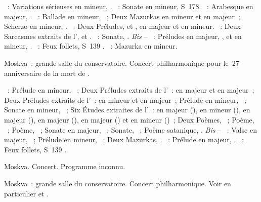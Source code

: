 \begin{description}
 \textsc{\Mendelssohn{}}~: Variations sérieuses en \kD mineur, .
 \textsc{\Liszt{}}~: Sonate en \kB mineur, S~178.
 \textsc{\Schumann{}}~: Arabesque en \kC majeur, .
 \textsc{\Chopin{}}~: Ballade en \kF mineur, ~; Deux Mazurkas en
 \kB mineur et en \kC majeur~; Scherzo en \kB mineur, .
 \textsc{\Chostakovitch{}}~: Deux Préludes,   et
 , en \kF \Sharp majeur et en \kC \Sharp mineur.
 \textsc{\Prokofiev{}}~: Deux Sarcasmes extraits de l', 
 et .
 \textsc{\Scriabine{}}~: Sonate, .
 \emph{Bis} -- \textsc{\Rachmaninov{}}~: Préludes en \kG majeur, 
 , et en \kG \Sharp mineur,  .
 \textsc{\Liszt{}}~: Feux follets, S~139 .
 \textsc{\Chopin{}}~: Mazurka en \kF mineur.
 \item[\DateWithWeekDay{1942-05-31}]
 Moskva~: grande salle du conservatoire.
 Concert philharmonique pour le~27\ieme{} anniversaire de la mort de
 \Scriabine{}.

 \textsc{\Scriabine{}}~: Prélude en \kG \Sharp mineur, 
 ~; Deux Préludes extraits de l'~:  en \kB
 \Flat majeur et  en \kD \Flat majeur~; Deux Préludes extraits de
 l'~:  en \kB \Flat mineur et  en \kF \Sharp
 majeur~; Prélude en \kB mineur,  ~; Sonate en \kF \Sharp
 mineur, ~; Six Études extraites de l'~: en \kC \Sharp
 majeur (), en \kF \Sharp mineur (), en \kB majeur
 (), en \kE majeur (), en \kA \Flat majeur ()
 et en \kG \Sharp mineur ()~; Deux Poèmes, ~; Poème,
  ~; Poème,  ~; Sonate en \kF \Sharp
 majeur, ~; Sonate, ~; Poème satanique, .
 \emph{Bis} -- \textsc{\Scriabine{}}~: Valse en \kA \Flat majeur,
 ~; Prélude en \kC \Sharp mineur,  ~; Deux
 Mazurkas, .
 \textsc{\Rachmaninov{}}~: Prélude en \kG majeur,  .
 \textsc{\Liszt{}}~: Feux follets, S~139 .
 \item[\DateWithWeekDay{1942-06-05}]
 Moskva.
 Concert.
 Programme inconnu.
 \item[\DateWithWeekDay{1942-06-12}]
 Moskva~: grande salle du conservatoire.
 Concert philharmonique.
 Voir en particulier \citet[p.~442]{Milshteyn82a} et
 \citet[p.~393]{Nikonovich08}.


\end{description}
